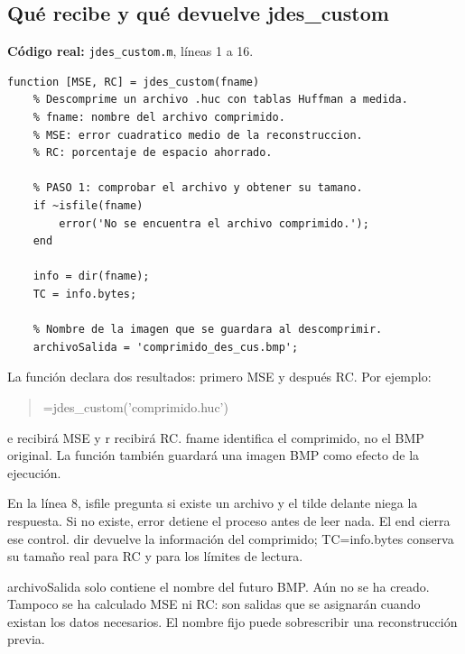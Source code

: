 \documentclass[11pt,a4paper,oneside]{report}
\begin{document}
\par\medskip\noindent\begin{minipage}{\linewidth}

\subsection{Qué recibe y qué devuelve jdes\_custom}

\textbf{Código real:} \texttt{jdes\_custom.m}, líneas 1 a 16.

\begin{lstlisting}[firstnumber=1]
function [MSE, RC] = jdes_custom(fname)
    % Descomprime un archivo .huc con tablas Huffman a medida.
    % fname: nombre del archivo comprimido.
    % MSE: error cuadratico medio de la reconstruccion.
    % RC: porcentaje de espacio ahorrado.

    % PASO 1: comprobar el archivo y obtener su tamano.
    if ~isfile(fname)
        error('No se encuentra el archivo comprimido.');
    end

    info = dir(fname);
    TC = info.bytes;

    % Nombre de la imagen que se guardara al descomprimir.
    archivoSalida = 'comprimido_des_cus.bmp';
\end{lstlisting}

\end{minipage}\par


La función declara dos resultados: primero MSE y después RC. Por ejemplo:
\begin{quote}\small\ttfamily [e,r]=jdes\_custom('comprimido.huc')\end{quote}
e recibirá MSE y r recibirá RC.
fname identifica el comprimido, no el BMP original. La función también
guardará una imagen BMP como efecto de la ejecución.

En la línea 8, isfile pregunta si existe un archivo y el tilde delante niega
la respuesta. Si no existe, error detiene el proceso antes de leer nada.
El end cierra ese control. dir devuelve la información del comprimido;
TC=info.bytes conserva su tamaño real para RC y para los límites de lectura.

archivoSalida solo contiene el nombre del futuro BMP. Aún no se ha creado.
Tampoco se ha calculado MSE ni RC: son salidas que se asignarán cuando existan
los datos necesarios. El nombre fijo puede sobrescribir una reconstrucción previa.
\end{document}
